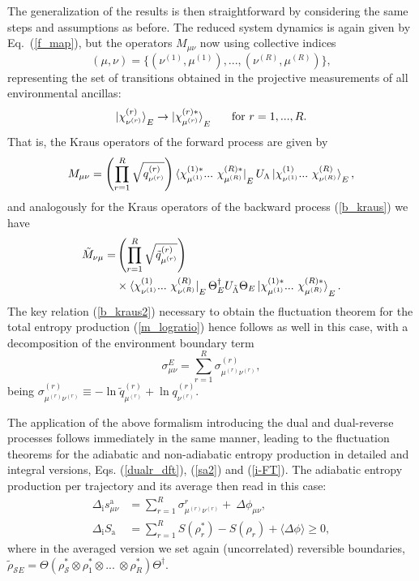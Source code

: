 \documentclass[aps,prx,twocolumn,showpacs,floatfix,superscriptaddress,graphics,longbibliography]{revtex4-1}
\newcommand{\HAT}{}
\begin{document}
The generalization of the results is then straightforward by considering the same steps and assumptions as before. The reduced system dynamics is 
again given by Eq.~(\ref{f_map}), but the operators $\HAT{M}_{\mu \nu}$ now using collective indices 
\begin{equation}
(\mu, \nu) = \{(\nu^{(1)}, \mu^{(1)}), ... , (\nu^{(R)}, \mu^{(R)})\},
\end{equation} 
representing the set of transitions obtained in the projective measurements of all environmental ancillas:
\begin{equation}\label{e_transition}
\ket{\chi^{(r)}_{\nu^{(r)}}}_E \rightarrow \ket{\chi^{(r) \ast}_{\mu^{(r)}}}_E ~~~~~\mathrm{ for}~ r= 1, ..., R.
\end{equation}
That is, the Kraus operators of the forward process are given by
\begin{equation}\label{k_ops_multi}
\HAT{M}_{\mu \nu} = \left( \prod_{r=1}^R \sqrt{q^{(r)}_{\nu^{(r)}}} \right) \bra{\chi^{(1) \ast}_{\mu^{(1)}} ... ~\chi^{(R) \ast}_{\mu^{(R)}}}_{E} \HAT{U}_{\Lambda} \ket{\chi^{(1)}_{\nu^{(1)}} ...~ \chi^{(R)}_{\nu^{(R)}}}_{E}, 
\end{equation}
and analogously for the Kraus operators of the backward process (\ref{b_kraus}) we have
\begin{align}\label{b_k_ops_multi} 
\HAT{\tilde{M}}_{\nu \mu} = & \left( \prod_{r=1}^R \sqrt{\tilde{q}^{(r)}_{\mu^{(r)}}} \right) \\  
& \times \bra{\chi^{(1)}_{\nu^{(1)}} ... ~\chi^{(R)}_{\nu^{(R)}}}_{E} \HAT{\Theta}_E^\dagger \HAT{U}_{\tilde{\Lambda}} \HAT{\Theta}_E \ket{\chi^{(1) \ast}_{\mu^{(1)}} ...~ \chi^{(R) \ast}_{\mu^{(R)}}}_{E}. \nonumber
\end{align}
The key relation (\ref{b_kraus2}) necessary to obtain the fluctuation theorem for the total entropy production (\ref{m_logratio}) hence follows as well in this case, 
with a decomposition of the environment boundary term
\begin{equation}
 \sigma_{\mu \nu}^E = \sum_{r=1}^R \sigma_{\mu^{(r)} \nu^{(r)}}^{(r)},
\end{equation}
being $\sigma_{\mu^{(r)} \nu^{(r)}}^{(r)} \equiv -\ln \tilde{q}^{(r)}_{\mu^{(r)}} + \ln q^{(r)}_{\nu^{(r)}}$.

The application of the above formalism introducing the dual and dual-reverse processes follows immediately in the same manner, leading to the fluctuation theorems 
for the adiabatic and non-adiabatic entropy production in detailed and integral versions, Eqs. (\ref{dualr_dft}), (\ref{sa2}) and (\ref{i-FT}).
The adiabatic entropy production per trajectory and its average then read in this case:
\begin{eqnarray}
\Delta_\mathrm{i} s^{\mathrm{a}}_{\mu \nu} &= \sum_{r=1}^R \sigma^r_{\mu^{(r)} \nu^{(r)}} + ~\Delta \phi_{\mu \nu},  \\
\Delta_\mathrm{i} S_\mathrm{ a} &=  \sum_{r=1}^R  S(\rho_r^\ast) - S(\rho_r)  + \langle \Delta \phi \rangle \geq 0,
\end{eqnarray}
where in the averaged version we set again (uncorrelated) reversible boundaries, $\tilde{\rho}_{\mathcal{S} E} = \HAT{\Theta} (\rho_{\mathcal{S}}^\ast \otimes \rho_1^\ast \otimes ... ~\otimes \rho_R^{\ast}) \HAT{\Theta}^\dagger$.
\end{document}

